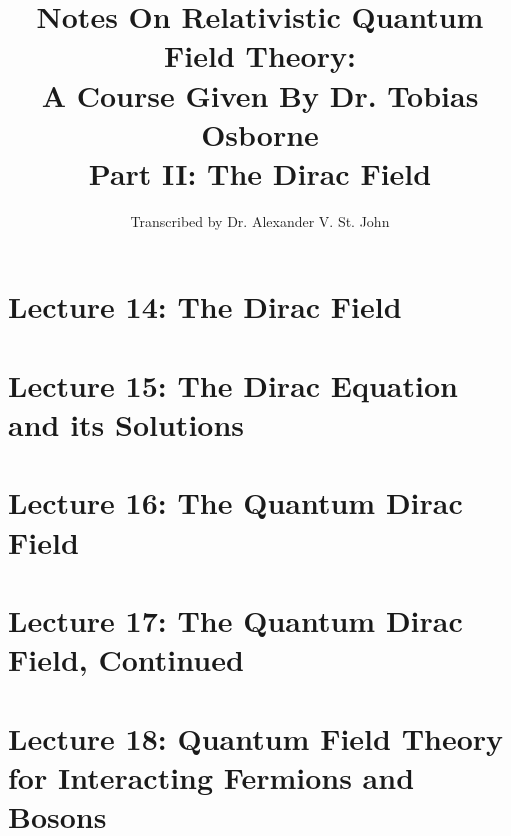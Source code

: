 \documentclass[10pt]{article}
\title{Notes On Relativistic Quantum Field Theory: \\ A Course Given By Dr. Tobias Osborne \\ Part II: The Dirac Field}
\author{Transcribed by Dr. Alexander V. St. John}
\begin{document}
\maketitle

\clearpage

\section*{Lecture 14: The Dirac Field}
\label{sec:lec14}

 

\clearpage

\section*{Lecture 15: The Dirac Equation and its Solutions}
\label{sec:lec15}

 

\clearpage

\section*{Lecture 16: The Quantum Dirac Field}
\label{sec:lec16}

 

\clearpage

\section*{Lecture 17: The Quantum Dirac Field, Continued}
\label{sec:lec17}

 

\clearpage

\section*{Lecture 18: Quantum Field Theory for Interacting Fermions and Bosons}
\label{sec:lec18}

 

\clearpage
\end{document}
